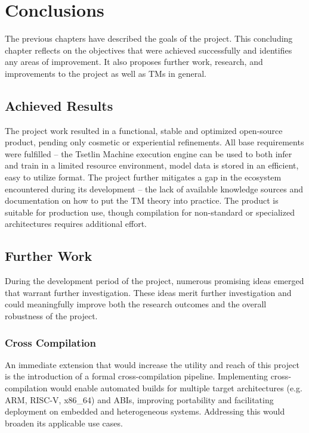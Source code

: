 \chapter{Conclusions}
\label{chap:conclusions}

The previous chapters have described the goals of the project. This concluding chapter reflects on the objectives that were achieved successfully and identifies any areas of improvement. It also proposes further work, research, and improvements to the project as well as TMs in general.

\section{Achieved Results}
The project work resulted in a functional, stable and optimized open-source product, pending only cosmetic or experiential refinements. All base requirements were fulfilled -- the Tsetlin Machine execution engine can be used to both infer and train in a limited resource environment, model data is stored in an efficient, easy to utilize format. The project further mitigates a gap in the ecosystem encountered during its development -- the lack of available knowledge sources and documentation on how to put the TM theory into practice. The product is suitable for production use, though compilation for non-standard or specialized architectures requires additional effort.

\section{Further Work}
During the development period of the project, numerous promising ideas emerged that warrant further investigation. These ideas merit further investigation and could meaningfully improve both the research outcomes and the overall robustness of the project.

\subsection{Cross Compilation}
An immediate extension that would increase the utility and reach of this project is the introduction of a formal cross-compilation pipeline. Implementing cross-compilation would enable automated builds for multiple target architectures (e.g. ARM, RISC-V, x86\_64) and ABIs, improving portability and facilitating deployment on embedded and heterogeneous systems. Addressing this would broaden its applicable use cases.

